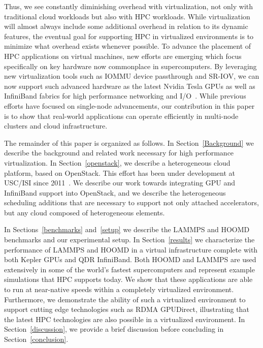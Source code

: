 \documentclass[10pt]{sigplanconf}
\begin{document}
Thus, we see constantly diminishing overhead
with virtualization, not only with traditional cloud workloads
\cite{huber2011evaluating} but also with HPC workloads.  While virtualization
will almost always include some additional overhead in relation to its dynamic
features, the eventual goal for supporting HPC in virtualized environments is to
minimize what overhead exists whenever possible.  To advance the placement of
HPC applications on virtual machines, new efforts are emerging which focus
specifically on key hardware now commonplace in supercomputers. By leveraging
new virtualization tools such as IOMMU device passthrough and SR-IOV, we can now
support such advanced hardware as the latest Nvidia Tesla GPUs
\cite{Walters2014cloud}  as well as InfiniBand fabrics for high performance networking
and I/O~\cite{jose2013sr,Musleh2014cloud}. While previous efforts have
focused on single-node advancements, our contribution in this paper is to show
that real-world applications can operate efficiently in multi-node clusters and cloud
infrastructure.  





The remainder of this paper is organized as follows.  In
Section~\ref{Background} we describe the background and related work necessary for high performance
virtualization. In Section~\ref{openstack}, we describe a heterogeneous cloud platform, based on OpenStack. This
effort has been under development at USC/ISI since 2011~\cite{crago2011heterogeneous}.
We describe our work towards integrating GPU and InfiniBand support into
OpenStack, and we describe the heterogeneous scheduling additions that are
necessary to support not only attached accelerators, but any cloud composed of
heterogeneous elements.  

In Sections~\ref{benchmarks} and~\ref{setup} we describe the LAMMPS and HOOMD
benchmarks and our experimental setup.  In Section~\ref{results} we characterize the
performance of LAMMPS and HOOMD in a virtual infrastructure complete with both
Kepler GPUs and QDR InfiniBand.  Both HOOMD and LAMMPS are used extensively in
some of the world's fastest supercomputers and represent example simulations
that HPC supports today.  We show that these applications are able to run at
near-native speeds within a completely virtualized environment.
Furthermore, we demonstrate the ability of such a virtualized environment to
support cutting edge technologies such as RDMA GPUDirect, illustrating that the
latest HPC technologies are also possible in a virtualized environment.
In Section~\ref{discussion}, we provide a brief discussion before concluding in
Section~\ref{conclusion}. 
\end{document}
